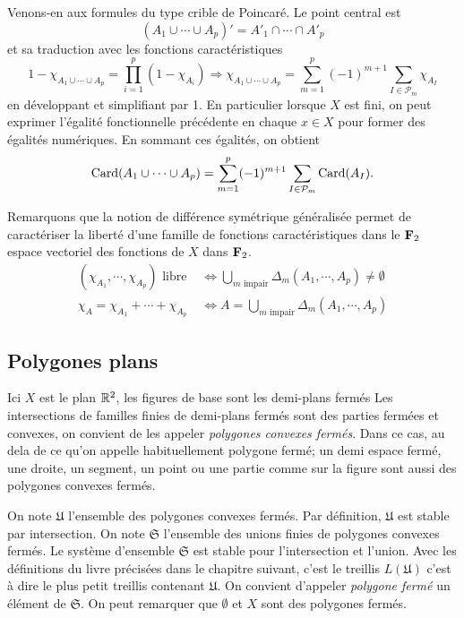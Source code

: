\noindent Venons-en aux formules du type crible de Poincaré. Le point central est 
\begin{displaymath}
  (A_1 \cup \cdots \cup A_p)' = A'_1 \cap \cdots \cap A'_p
\end{displaymath}
et sa traduction avec les fonctions caractéristiques
\begin{displaymath}
  1 - \chi_{A_1 \cup \cdots \cup A_p} = \prod_{i=1}^p(1 - \chi_{A_i})
  \Rightarrow
  \chi_{A_1 \cup \cdots \cup A_p} = \sum_{m=1}^p (-1)^{m+1}\sum_{I \in \mathcal{P}_m}\chi_{A_I} 
\end{displaymath}
en développant et simplifiant par 1.\newline
En particulier lorsque $X$ est fini, on peut exprimer l'égalité fonctionnelle précédente en chaque $x\in X$ pour former des égalités numériques. En sommant ces égalités, on obtient
\begin{displaymath}
  \mathop{\mathrm{Card}}(A_1 \cup \cdots \cup A_p) = \sum_{m=1}^p (-1)^{m+1}\sum_{I \in \mathcal{P}_m}\mathop{\mathrm{Card}}(A_I).
\end{displaymath}


\noindent Remarquons que la notion de différence symétrique généralisée permet de caractériser la liberté d'une famille de fonctions caractéristiques dans le $\mathbf{F}_2$ espace vectoriel des fonctions de $X$ dans $\mathbf{F}_2$.
\begin{align*}
  (\chi_{A_1}, \cdots, \chi_{A_p}) \text{ libre } &\Leftrightarrow \bigcup_{m \text{ impair}} \Delta_m(A_1, \cdots, A_p) \not = \emptyset \\
  \chi_A = \chi_{A_1} + \cdots + \chi_{A_p} &\Leftrightarrow A = \bigcup_{m \text{ impair}} \Delta_m(A_1, \cdots, A_p)
\end{align*}

\subsection{Polygones plans}\label{ExplePolyg}
Ici $X$ est le plan $\mathbb{R}^2$, les figures de base sont les demi-plans fermés Les intersections de familles finies de demi-plans fermés sont des parties fermées et convexes, on convient de les appeler \emph{polygones convexes fermés}. Dans ce cas, au dela de ce qu'on appelle habituellement polygone fermé; un demi espace fermé, une droite, un segment, un point ou une partie comme sur la figure sont aussi des polygones convexes fermés.

On  note $\mathfrak U$ l'ensemble des polygones convexes fermés. Par définition, $\mathfrak{U}$ est stable par intersection. On note $\mathfrak{S}$ l'ensemble des unions finies de polygones convexes fermés. Le système d'ensemble $\mathfrak{S}$ est stable pour l'intersection et l'union. Avec les définitions du livre précisées dans le chapitre suivant, c'est le treillis $L(\mathfrak U)$ c'est à dire le plus petit treillis contenant $\mathfrak{U}$.\newline
On convient d'appeler \emph{polygone fermé} un élément de $\mathfrak{S}$. On peut remarquer que $\emptyset$ et $X$ sont des polygones fermés.

